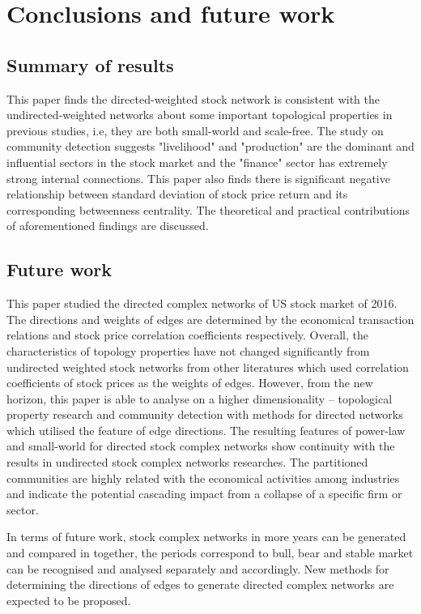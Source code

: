 \chapter[Conclusions]{Conclusions and future work}
\label{cpt:conclude}
\section{Summary of results}
This paper finds the directed-weighted stock network is consistent with the undirected-weighted networks about some important topological properties in previous studies, i.e, they are both small-world and scale-free. The study on community detection suggests "livelihood" and "production" are the dominant and influential sectors in the stock market and the "finance" sector has extremely strong internal connections. This paper also finds there is significant negative relationship between standard deviation of stock price return and its corresponding betweenness centrality. The theoretical and practical contributions of aforementioned findings are discussed.

\section{Future work}
This paper studied the directed complex networks of US stock market of 2016. The directions and weights of edges are determined by the economical transaction relations and stock price correlation coefficients respectively. Overall, the characteristics of topology properties have not changed significantly from undirected weighted stock networks from other literatures which used correlation coefficients of stock prices as the weights of edges. However, from the new horizon, this paper is able to analyse on a higher dimensionality -- topological property research and community detection with methods for directed networks which utilised the feature of edge directions. The resulting features of power-law and small-world for directed stock complex networks show continuity with the results in undirected stock complex networks researches. The partitioned communities are highly related with the economical activities among industries and indicate the potential cascading impact from a collapse of a specific firm or sector.

In terms of future work, stock complex networks in more years can be generated and compared in together, the periods correspond to bull, bear and stable market can be recognised and analysed separately and accordingly. New methods for determining the directions of edges to generate directed complex networks are expected to be proposed.

